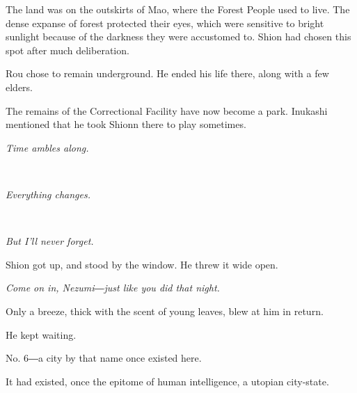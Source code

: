 The land was on the outskirts of Mao, where the Forest People used to
live. The dense expanse of forest protected their eyes, which were
sensitive to bright sunlight because of the darkness they were
accustomed to. Shion had chosen this spot after much deliberation.

Rou chose to remain underground. He ended his life there, along with a
few elders.

The remains of the Correctional Facility have now become a park.
Inukashi mentioned that he took Shionn there to play sometimes.

\emph{Time ambles along.}

\emph{\\
}

\emph{Everything changes.}

\emph{\\
}

\emph{But I'll never forget.}

Shion got up, and stood by the window. He threw it wide open.

\emph{Come on in, Nezumi―just like you did that night.}

Only a breeze, thick with the scent of young leaves, blew at him in
return.

He kept waiting.

No. 6―a city by that name once existed here.

It had existed, once the epitome of human intelligence, a utopian
city-state.
